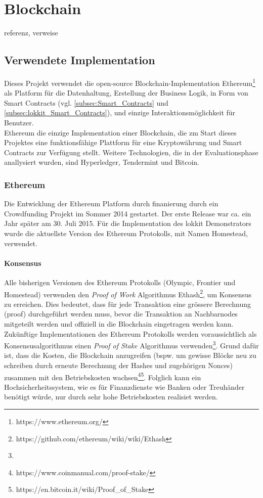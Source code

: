 \section{Blockchain}
\label{sec:Blockchain}
referenz, verweise

\subsection{Verwendete Implementation}
Dieses Projekt verwendet die open-source Blockchain-Implementation Ethereum\footnote{https://www.ethereum.org/} als Platform für die Datenhaltung, Erstellung der Business Logik, in Form von Smart Contracts (vgl. \ref{subsec:Smart_Contracts} und \ref{subsec:lokkit_Smart_Contracts}), und einzige Interaktionsmöglichkeit für Benutzer.\\Ethereum die einzige Implementation einer Blockchain, die zm Start dieses Projektes eine funktionsfähige Plattform für eine Kryptowährung und Smart Contracts zur Verfügung stellt. Weitere Technologien, die in der Evaluationsphase anallysiert wurden, sind Hyperledger, Tendermint und Bitcoin.

\subsubsection{Ethereum}
Die Entwicklung der Ethereum Platform durch finanierung durch ein Crowdfunding Projekt im Sommer 2014 gestartet. Der erste Release war ca. ein Jahr später am 30. Juli 2015. Für die Implementation des lokkit Demonstrators wurde die aktuellste Version des Ethereum Protokolls, mit Namen Homestead, verwendet.
\paragraph{Konsensus}
Alle bisherigen Versionen des Ethereum Protokolls (Olympic, Frontier und Homestead) verwenden den \emph{Proof of Work} Algorithmus Ethash\footnote{https://github.com/ethereum/wiki/wiki/Ethash}, um Konsensus zu erreichen. Dies bedeutet, dass für jede Transaktion eine grössere Berechnung (proof) durchgeführt werden muss, bevor die Transaktion an Nachbarnodes mitgeteilt werden und offiziell in die Blockchain eingetragen werden kann. \\Zukünftige Implementationen des Ethereum Protokolls werden voraussichtlich als Konsensusalgorithmus einen \emph{Proof of Stake} Algorithmus verwenden\footnote{}. Grund dafür ist, dass die Kosten, die Blockchain anzugreifen (bspw. um gewisse Blöcke neu zu schreiben durch erneute Berechnung der Hashes und zugehörigen Nonces) zusammen mit den Betriebskosten wachsen\footnote{https://www.coinmanual.com/proof-stake/}\footnote{https://en.bitcoin.it/wiki/Proof_of_Stake}. Folglich kann ein Hochsicherheitssystem, wie es für Finanzdienste wie Banken oder Treuhänder benötigt würde, nur durch sehr hohe Betriebskosten realisiet werden.

